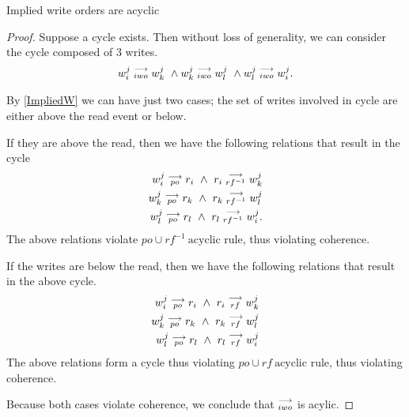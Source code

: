         
    \begin{property}
        \label{prop6}
        Implied write orders are acyclic
    \end{property}

    \begin{proof}
        Suppose a cycle exists. Then without loss of generality, we can consider the cycle composed of 3 writes.
        \begin{align}
            \reln{w_i^j}{iwo}{w_k^j} \ \wedge \reln{w_k^j}{iwo}{w_l^j} \ \wedge \reln{w_l^j}{iwo}{w_i^j}.  
        \end{align}
        
        By \ref{ImpliedW} we can have just two cases; the set of writes involved in cycle are either above the read event or below.

        If they are above the read, then we have the following relations that result in the cycle
        \begin{align}
            w_i^j\stackrel{\longrightarrow}{_{po}}r_i \ \wedge \ r_i\stackrel{\longrightarrow}{_{rf^{-1}}}w_k^j \\
            w_k^j\stackrel{\longrightarrow}{_{po}}r_k \ \wedge \ r_k\stackrel{\longrightarrow}{_{rf^{-1}}}w_l^j \\
            w_l^j\stackrel{\longrightarrow}{_{po}}r_l \ \wedge \ r_l\stackrel{\longrightarrow}{_{rf^{-1}}}w_i^j. 
        \end{align}
        The above relations violate $po \cup rf^{-1} \ \text{acyclic}$ rule, thus violating coherence.
        
        If the writes are below the read, then we have the following relations that result in the above cycle.
        \begin{align}
            w_i^j\stackrel{\longrightarrow}{_{po}}r_i \ \wedge \ r_i\stackrel{\longrightarrow}{_{rf}}w_k^j \\
            w_k^j\stackrel{\longrightarrow}{_{po}}r_k \ \wedge \ r_k\stackrel{\longrightarrow}{_{rf}}w_l^j \\
            w_l^j\stackrel{\longrightarrow}{_{po}}r_l \ \wedge \ r_l\stackrel{\longrightarrow}{_{rf}}w_i^j 
        \end{align}
        The above relations form a cycle thus violating $po \cup rf \ \text{acyclic}$ rule, thus violating coherence.

        Because both cases violate coherence, we conclude that $\stackrel{\longrightarrow}{_{iwo}}$ is acylic. 
    \end{proof}

